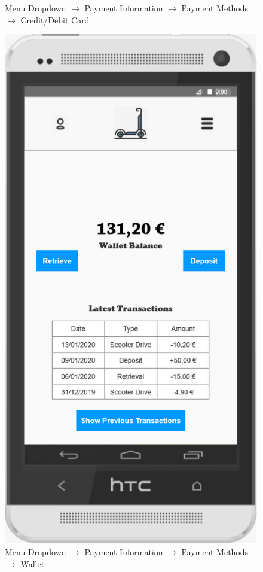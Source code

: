 \documentclass[a4paper, 12pt]{article}
\begin{document}
\begin{figure} [htbp]
\begin{center}
\begin{minipage}{0.45\textwidth}
\begin{center}
            \end{center}
            \caption{Menu Dropdown $\rightarrow$ Payment Information $\rightarrow$ Payment Methods $\rightarrow$ Credit/Debit Card}
        \end{minipage}\hfill
        \begin{minipage}{0.45\textwidth}
            \begin{center}
                \includegraphics[scale=0.65]{images/prototypes/02-02-01-02-menu-dropdown--payment-information--payment-methods--wallet.png}
            \end{center}
            \caption{Menu Dropdown $\rightarrow$ Payment Information $\rightarrow$ Payment Methods $\rightarrow$ Wallet}
        \end{minipage}
    \end{center}
\end{figure}
\end{document}
